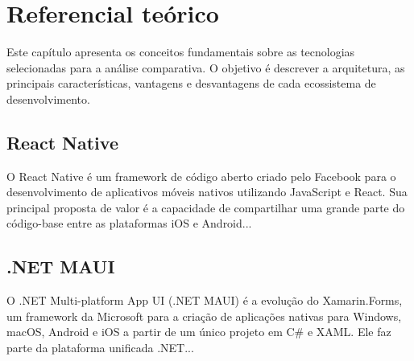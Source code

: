 \chapter{Referencial te\'orico}\label{cap:referencialTeorico}

Este capítulo apresenta os conceitos fundamentais sobre as tecnologias selecionadas para a análise comparativa. O objetivo é descrever a arquitetura, as principais características, vantagens e desvantagens de cada ecossistema de desenvolvimento.

\section{React Native}
\label{sec:react_native}

O React Native é um framework de código aberto criado pelo Facebook para o desenvolvimento de aplicativos móveis nativos utilizando JavaScript e React. Sua principal proposta de valor é a capacidade de compartilhar uma grande parte do código-base entre as plataformas iOS e Android... 

\section{.NET MAUI}
\label{sec:dotnet_maui}

O .NET Multi-platform App UI (.NET MAUI) é a evolução do Xamarin.Forms, um framework da Microsoft para a criação de aplicações nativas para Windows, macOS, Android e iOS a partir de um único projeto em C\# e XAML. Ele faz parte da plataforma unificada .NET...

